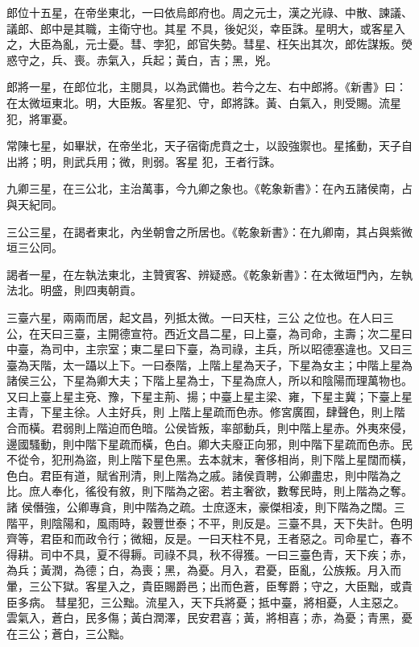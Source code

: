 \begin{pinyinscope}
 郎位十五星，在帝坐東北，一曰依烏郎府也。周之元士，漢之光祿、中散、諫議、議郎、郎中是其職，主衛守也。其星
 不具，後妃災，幸臣誅。星明大，或客星入之，大臣為亂，元士憂。彗、孛犯，郎官失勢。彗星、枉矢出其次，郎佐謀叛。熒惑守之，兵、喪。赤氣入，兵起；黃白，吉；黑，兇。



 郎將一星，在郎位北，主閱具，以為武備也。若今之左、右中郎將。《新書》曰：在太微垣東北。明，大臣叛。客星犯、守，郎將誅。黃、白氣入，則受賜。流星犯，將軍憂。



 常陳七星，如畢狀，在帝坐北，天子宿衛虎賁之士，以設強禦也。星搖動，天子自出將；明，則武兵用；微，則弱。客星
 犯，王者行誅。



 九卿三星，在三公北，主治萬事，今九卿之象也。《乾象新書》：在內五諸侯南，占與天紀同。



 三公三星，在謁者東北，內坐朝會之所居也。《乾象新書》：在九卿南，其占與紫微垣三公同。



 謁者一星，在左執法東北，主贊賓客、辨疑惑。《乾象新書》：在太微垣門內，左執法北。明盛，則四夷朝貢。



 三臺六星，兩兩而居，起文昌，列抵太微。一曰天柱，三公
 之位也。在人曰三公，在天曰三臺，主開德宣符。西近文昌二星，曰上臺，為司命，主壽；次二星曰中臺，為司中，主宗室；東二星曰下臺，為司祿，主兵，所以昭德塞違也。又曰三臺為天階，太一躡以上下。一曰泰階，上階上星為天子，下星為女主；中階上星為諸侯三公，下星為卿大夫；下階上星為士，下星為庶人，所以和陰陽而理萬物也。又曰上臺上星主兗、豫，下星主荊、揚；中臺上星主梁、雍，下星主冀；下臺上星主青，下星主徐。人主好兵，則
 上階上星疏而色赤。修宮廣囿，肆聲色，則上階合而橫。君弱則上階迫而色暗。公侯皆叛，率部動兵，則中階上星赤。外夷來侵，邊國騷動，則中階下星疏而橫，色白。卿大夫廢正向邪，則中階下星疏而色赤。民不從令，犯刑為盜，則上階下星色黑。去本就末，奢侈相尚，則下階上星闊而橫，色白。君臣有道，賦省刑清，則上階為之戚。諸侯貢聘，公卿盡忠，則中階為之比。庶人奉化，徭役有敘，則下階為之密。若主奢欲，數奪民時，則上階為之奪。諸
 侯僭強，公卿專貪，則中階為之疏。士庶逐末，豪傑相凌，則下階為之闊。三階平，則陰陽和，風雨時，穀豐世泰；不平，則反是。三臺不具，天下失計。色明齊等，君臣和而政令行；微細，反是。一曰天柱不見，王者惡之。司命星亡，春不得耕。司中不具，夏不得耨。司祿不具，秋不得獲。一曰三臺色青，天下疾；赤，為兵；黃潤，為德；白，為喪；黑，為憂。月入，君憂，臣亂，公族叛。月入而暈，三公下獄。客星入之，貴臣賜爵邑；出而色蒼，臣奪爵；守之，大臣黜，或貴臣多病。
 彗星犯，三公黜。流星入，天下兵將憂；抵中臺，將相憂，人主惡之。雲氣入，蒼白，民多傷；黃白潤澤，民安君喜；黃，將相喜；赤，為憂；青黑，憂在三公；蒼白，三公黜。




\end{pinyinscope}
